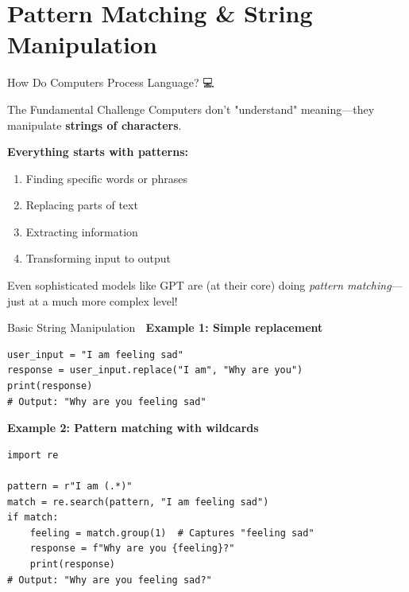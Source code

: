 \documentclass[aspectratio=169]{beamer}
\begin{document}
\section{Pattern Matching \& String Manipulation}

\begin{frame}{How Do Computers Process Language? 💻}
\small
\begin{block}{The Fundamental Challenge}
Computers don't "understand" meaning—they manipulate \textbf{strings of characters}.
\end{block}

\vspace{0.3cm}

\textbf{Everything starts with patterns:}
\begin{enumerate}\setlength{\itemsep}{0pt}
    \item Finding specific words or phrases
    \item Replacing parts of text
    \item Extracting information
    \item Transforming input to output
\end{enumerate}

\vspace{0.3cm}

Even sophisticated models like GPT are (at their core) doing \textit{pattern matching}—just at a much more complex level!
\end{frame}

\begin{frame}[fragile]{Basic String Manipulation 🔧}
\textbf{Example 1: Simple replacement}

\begin{lstlisting}
user_input = "I am feeling sad"
response = user_input.replace("I am", "Why are you")
print(response)
# Output: "Why are you feeling sad"
\end{lstlisting}

\vspace{0.3cm}

\textbf{Example 2: Pattern matching with wildcards}

\begin{lstlisting}
import re

pattern = r"I am (.*)"
match = re.search(pattern, "I am feeling sad")
if match:
    feeling = match.group(1)  # Captures "feeling sad"
    response = f"Why are you {feeling}?"
    print(response)
# Output: "Why are you feeling sad?"
\end{lstlisting}
\end{frame}
\end{document}
